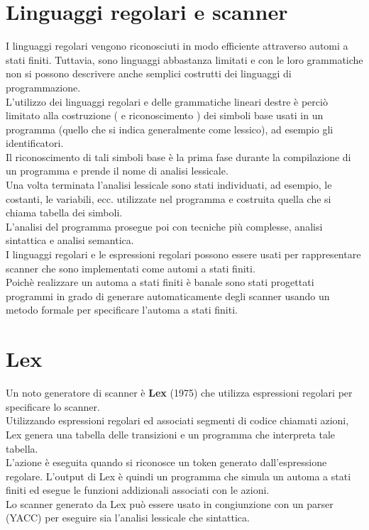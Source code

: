 \documentclass[12pt]{report}
\begin{document}
	\section{Linguaggi regolari e scanner}
	I linguaggi regolari vengono riconosciuti in modo efficiente attraverso automi a stati finiti. Tuttavia, sono linguaggi abbastanza limitati e con le loro grammatiche non si possono descrivere anche semplici costrutti dei linguaggi di programmazione. \\
	L'utilizzo dei linguaggi regolari e delle grammatiche lineari destre è perciò limitato alla costruzione ( e riconoscimento ) dei simboli base usati in un programma (quello che si indica generalmente come lessico), ad esempio gli identificatori. \\
	Il riconoscimento di tali simboli base è la prima fase durante la compilazione di un programma e prende il nome di analisi lessicale. \\
	Una volta terminata l'analisi lessicale sono stati individuati, ad esempio, le costanti, le variabili, ecc. utilizzate nel programma e costruita quella che si chiama tabella dei simboli. \\
	L'analisi del programma prosegue poi con tecniche più complesse, analisi sintattica e analisi semantica. \\
	I linguaggi regolari e le espressioni regolari possono essere usati per rappresentare scanner che sono implementati come automi a stati finiti. \\
	Poichè realizzare un automa a stati finiti è banale sono stati progettati programmi in grado di generare automaticamente degli scanner usando un metodo formale per specificare l'automa a stati finiti. \\
	\section{Lex}
	Un noto generatore di scanner è \textbf{Lex} (1975) che utilizza espressioni regolari per specificare lo scanner. \\
	Utilizzando espressioni regolari ed associati segmenti di codice chiamati azioni, Lex genera una tabella delle transizioni e un programma che interpreta tale tabella. \\
	L'azione è eseguita quando si riconosce un token generato dall'espressione regolare. L'output di Lex è quindi un programma che simula un automa a stati finiti ed esegue le funzioni addizionali associati con le azioni. \\
	Lo scanner generato da Lex può essere usato in congiunzione con un parser (YACC) per eseguire sia l'analisi lessicale che sintattica.
\end{document}
